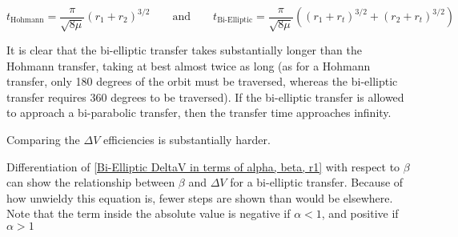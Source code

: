 \documentclass[../main.tex]{subfiles}
\begin{document}
$$t_\text{Hohmann}=\frac{\pi}{\sqrt{8\mu}}(r_1+r_2)^{3/2}\qquad\text{and}\qquad t_\text{Bi-Elliptic}=\frac{\pi}{\sqrt{8\mu}}\left((r_1+r_t)^{3/2}+(r_2+r_t)^{3/2}\right)$$

It is clear that the bi-elliptic transfer takes substantially longer than the Hohmann transfer, taking at best almost twice as long (as for a Hohmann transfer, only 180 degrees of the orbit must be traversed, whereas the bi-elliptic transfer requires 360 degrees to be traversed). If the bi-elliptic transfer is allowed to approach a bi-parabolic transfer, then the transfer time approaches infinity.

Comparing the $\Delta V$ efficiencies is substantially harder.

Differentiation of \eqref{Bi-Elliptic DeltaV in terms of alpha, beta, r1} with respect to $\beta$ can show the relationship between $\beta$ and $\Delta V$ for a bi-elliptic transfer. Because of how unwieldy this equation is, fewer steps are shown than would be elsewhere. Note that the term inside the absolute value is negative if $\alpha<1$, and positive if $\alpha>1$


\end{document}
